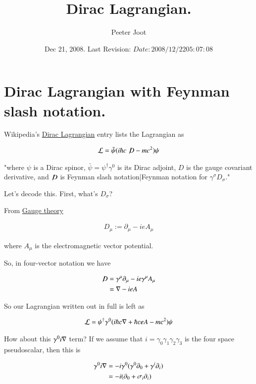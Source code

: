 \documentclass{article}
\title{ Dirac Lagrangian. }
\author{Peeter Joot}
\date{ Dec 21, 2008.  Last Revision: $Date: 2008/12/22 05:07:08 $ }
\newcommand{\Dslash}[0]{ \not\!D }
\begin{document}
\maketitle{}
\tableofcontents

\section{ Dirac Lagrangian with Feynman slash notation. }

Wikipedia's \href{http://en.wikipedia.org/wiki/Lagrangian#Dirac_Lagrangian}{Dirac Lagrangian} entry lists the Lagrangian as

\begin{align*}
\LL = \bar \psi (i \hbar c \Dslash - mc^2) \psi
\end{align*}

"where $\psi\!$ is a Dirac spinor, $\bar \psi = \psi^\dagger \gamma^0$ is its Dirac adjoint, $D\!$ is the gauge covariant derivative, and $\Dslash$ is Feynman slash notation|Feynman notation for $\gamma^\sigma D_\sigma\!$."

Let's decode this.  First, what's $D_\sigma$?

From \href{http://en.wikipedia.org/wiki/Gauge_covariant_derivative}{Gauge theory}

\begin{align*}
D_\mu := \partial_\mu - i e A_\mu
\end{align*}

where $A_\mu$ is the electromagnetic vector potential.

So, in four-vector notation we have

\begin{align*}
\Dslash 
&= \gamma^\mu \partial_\mu - i e \gamma^\mu A_\mu \\
&= \grad - i e A \\
\end{align*}

So our Lagrangian written out in full is left as

\begin{align}\label{eqn:lag1}
\mathcal{L} = \psi^\dagger \gamma^0 ( i \hbar c \nabla + \hbar c e A - mc^2) \psi
\end{align}

How about this $\gamma^0 i \nabla$ term?  If we assume that $i = \gamma_0 \gamma_1 \gamma_2 \gamma_3$ is the four space pseudoscalar, then this is

\begin{align*}
\gamma^0 i \nabla
&= - i \gamma^0 (\gamma^0 \partial_0 + \gamma^i \partial_i) \\
&= - i (\partial_0 + \sigma_i \partial_i) \\
\end{align*}
\end{document}
